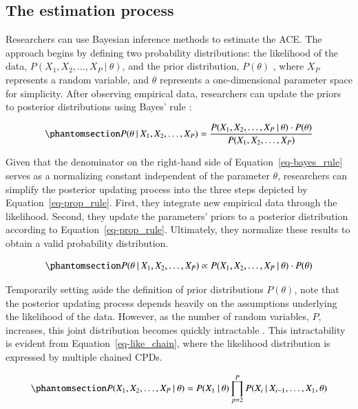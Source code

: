\documentclass[
  authoryear,
  review,
  1p]{elsarticle}
\begin{document}
\subsection{The estimation process}\label{sec-appendix-E}

Researchers can use Bayesian inference methods to estimate the ACE. The
approach begins by defining two probability distributions: the
likelihood of the data,
\(P(X_{1}, X_{2}, \dots, X_{P} \: | \: \theta)\), and the prior
distribution, \(P(\theta)\) \citep{Everitt_et_al_2010}, where \(X_{P}\)
represents a random variable, and \(\theta\) represents a
one-dimensional parameter space for simplicity. After observing
empirical data, researchers can update the priors to posterior
distributions using Bayes' rule \citep{Jeffreys_1998}:

\begin{equation}\phantomsection\label{eq-bayes_rule}{
P(\theta \: | \: X_{1}, X_{2}, \dots, X_{P}) = \frac{P(X_{1}, X_{2}, \dots, X_{P} \: | \: \theta) \cdot P(\theta)}{P(X_{1}, X_{2}, \dots, X_{P})}
}\end{equation}

Given that the denominator on the right-hand side of
Equation~\ref{eq-bayes_rule} serves as a normalizing constant
independent of the parameter \(\theta\), researchers can simplify the
posterior updating process into the three steps depicted by
Equation~\ref{eq-prop_rule}. First, they integrate new empirical data
through the likelihood. Second, they update the parameters' priors to a
posterior distribution according to Equation~\ref{eq-prop_rule}.
Ultimately, they normalize these results to obtain a valid probability
distribution.

\begin{equation}\phantomsection\label{eq-prop_rule}{
P(\theta \: | \: X_{1}, X_{2}, \dots, X_{P}) \propto P(X_{1}, X_{2}, \dots, X_{P}\: | \: \theta) \cdot P(\theta)
}\end{equation}

Temporarily setting aside the definition of prior distributions
\(P(\theta)\), note that the posterior updating process depends heavily
on the assumptions underlying the likelihood of the data. However, as
the number of random variables, \(P\), increases, this joint
distribution becomes quickly intractable \citep{Neal_2020}. This
intractability is evident from Equation~\ref{eq-like_chain}, where the
likelihood distribution is expressed by multiple chained CPDs.

\begin{equation}\phantomsection\label{eq-like_chain}{
P(X_{1}, X_{2}, \dots, X_{P} \: | \: \theta) = P(X_{1} \: | \: \theta) \prod^{P}_{p=2} P(X_{i} \: | \: X_{i-1}, \dots, X_{1}, \theta )
}\end{equation}
\end{document}
